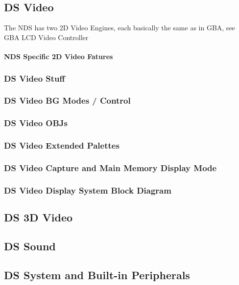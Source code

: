 \documentclass[11pt,a4paper]{proc}
\begin{document}
\begin{flushleft}
\subsection{DS Video}
The NDS has two 2D Video Engines, each basically the same as in GBA, see GBA LCD Video Controller

\paragraph{NDS Specific 2D Video Fatures}

\subsubsection{DS Video Stuff}

\subsubsection{DS Video BG Modes / Control}

\subsubsection{DS Video OBJs}

\subsubsection{DS Video Extended Palettes}

\subsubsection{DS Video Capture and Main Memory Display Mode}

\subsubsection{DS Video Display System Block Diagram}

\subsection{DS 3D Video}

\subsection{DS Sound}

\subsection{DS System and Built-in Peripherals}


\end{flushleft}
\end{document}
